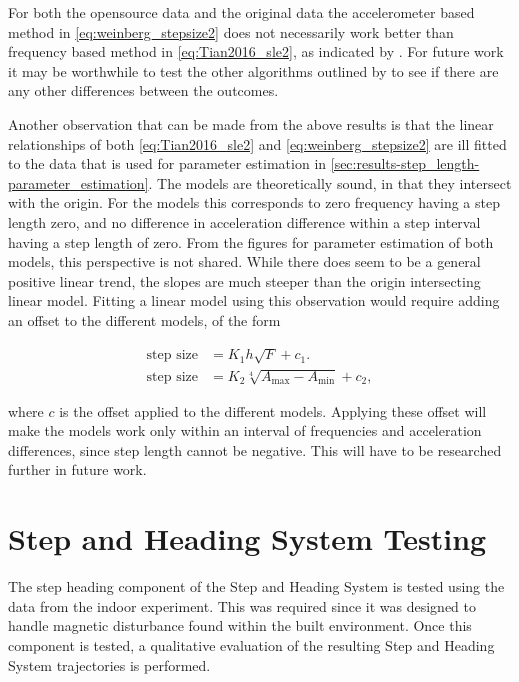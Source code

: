 For both the opensource data and the original data the accelerometer based method in \eqref{eq:weinberg_stepsize2} does not necessarily work better than frequency based method in \eqref{eq:Tian2016_sle2}, as indicated by \citet{Vezocnik2019}. For future work it may be worthwhile to test the other algorithms outlined by \cite{Vezocnik2019} to see if there are any other differences between the outcomes. \par 

Another observation that can be made from the above results is that the linear relationships of both \eqref{eq:Tian2016_sle2} and \eqref{eq:weinberg_stepsize2} are ill fitted to the data that is used for parameter estimation in \cref{sec:results-step_length-parameter_estimation}. The models are theoretically sound, in that they intersect with the origin. For the models this corresponds to zero frequency having a step length zero, and no difference in acceleration difference within a step interval having a step length of zero. From the figures for parameter estimation of both models, this perspective is not shared. While there does seem to be a general positive linear trend, the slopes are much steeper than the origin intersecting linear model. Fitting a linear model using this observation would require adding an offset to the different models, of the form

\begin{align}
	\text{step size} &= K_1 h \sqrt{F} + c_1. \\
	\text{step size} &= K_2 \sqrt[4]{A_{\max }-A_{\min }} + c_2,
\end{align}

where $ c $ is the offset applied to the different models. Applying these offset will make the models work only within an interval of frequencies and acceleration differences, since step length cannot be negative. This will have to be researched further in future work.


\section[SHS Testing]{Step and Heading System Testing}

The step heading component of the Step and Heading System is tested using the data from the indoor experiment. This was required since it was designed to handle magnetic disturbance found within the built environment. Once this component is tested, a qualitative evaluation of the resulting Step and Heading System trajectories is performed.


